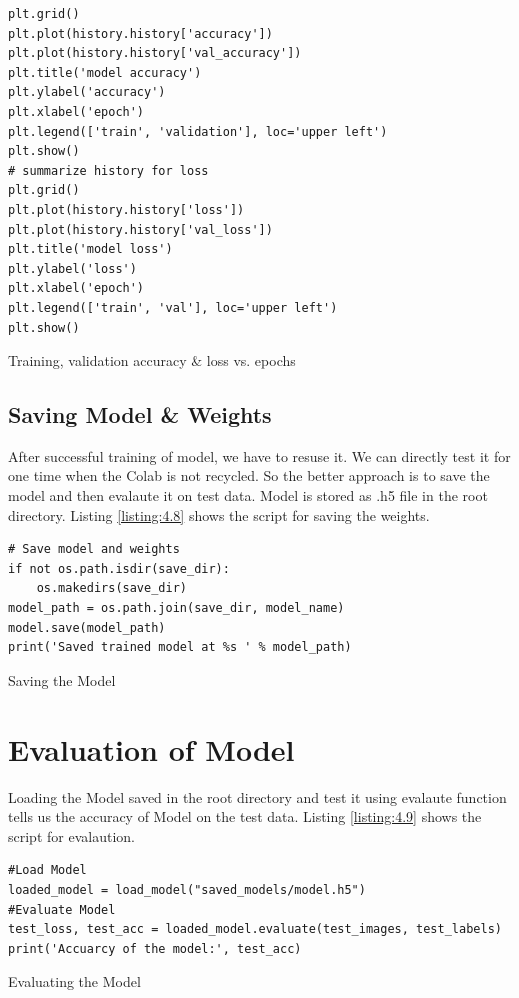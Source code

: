 \begin{longlisting}
    \begin{verbatim}
plt.grid()
plt.plot(history.history['accuracy'])
plt.plot(history.history['val_accuracy'])
plt.title('model accuracy')
plt.ylabel('accuracy')
plt.xlabel('epoch')
plt.legend(['train', 'validation'], loc='upper left')
plt.show()
# summarize history for loss
plt.grid()
plt.plot(history.history['loss'])
plt.plot(history.history['val_loss'])
plt.title('model loss')
plt.ylabel('loss')
plt.xlabel('epoch')
plt.legend(['train', 'val'], loc='upper left')
plt.show()
\end{verbatim}
\caption{Training, validation accuracy \& loss vs. epochs}
\label{listing:4.7}
\end{longlisting}

\subsection{Saving Model \& Weights}
After successful training of model, we have to resuse it. We can directly test it for one time
when the Colab is not recycled. So the better approach is to save the model
and then evalaute it on test data. Model is stored as .h5 file in the root directory.
Listing \ref{listing:4.8} shows the script for saving the weights.

\begin{listing}[H]
    \begin{verbatim}
# Save model and weights
if not os.path.isdir(save_dir):
    os.makedirs(save_dir)
model_path = os.path.join(save_dir, model_name)
model.save(model_path)
print('Saved trained model at %s ' % model_path)
\end{verbatim}
\caption{Saving the Model}
\label{listing:4.8}
\end{listing}
\section{Evaluation of Model}
Loading the Model saved in the root directory and test it using evalaute function
tells us the accuracy of Model on the test data. Listing \ref{listing:4.9} shows the script for
evalaution.
\begin{longlisting}
    \begin{verbatim}
#Load Model
loaded_model = load_model("saved_models/model.h5")
#Evaluate Model
test_loss, test_acc = loaded_model.evaluate(test_images, test_labels)
print('Accuarcy of the model:', test_acc)
\end{verbatim}
\caption{Evaluating the Model}
\label{listing:4.9}
\end{longlisting}
